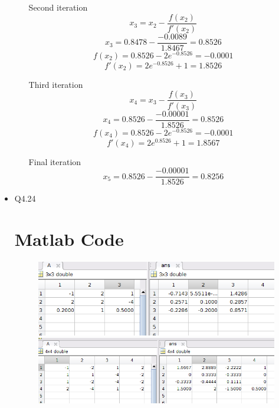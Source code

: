 \documentclass{article}
\begin{document}
\begin{itemize}
\begin{enumerate}[label=(\alph*)]
  Second iteration
  \[ x_3=x_2 - \frac{f(x_2)}{f'(x_2)}\]
  \[ x_3=0.8478 - \frac{-0.0089}{1.8467}=0.8526\]
  \[ f(x_2)= 0.8526-2e^{-0.8526}=-0.0001\]
  \[ f'(x_2)=2e^{-0.8526}+1=1.8526\]
  
  Third iteration
  \[ x_4=x_3 - \frac{f(x_3)}{f'(x_3)}\]
  \[ x_4=0.8526 - \frac{-0.00001}{1.8526}=0.8526\]
  \[ f(x_4)= 0.8526-2e^{-0.8526}=-0.0001\]
  \[ f'(x_4)=2e^{0.8526}+1=1.8567\]
  
  Final iteration
  \[ x_5=0.8526 - \frac{-0.00001}{1.8526}=0.8256\]
  \end{enumerate}
\item Q4.24
\\
\section*{Matlab Code}

\begin{figure}[htbp]
\hspace*{-2cm}
\includegraphics[scale=0.65]{3i.png}
\\
\hspace*{-2cm}
\includegraphics[scale=0.65]{3ii.png}
\end{figure}


\end{itemize}
\end{document}
